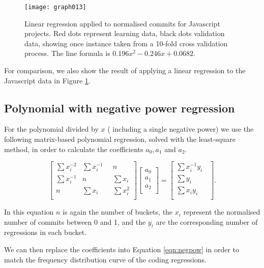 \documentclass[10pt,journal,compsoc]{IEEEtran}
\begin{document}
\begin{figure}[t]
\centering
\texttt{[image: graph013]}%
\caption{\label{fig:javascript-linear}Linear regression applied to normalised commits for Javascript projects. Red dots represent learning data, black dots validation data, showing once instance taken from a 10-fold cross validation process. The line formula is $0.196x^{2} - 0.246x + 0.0682$.}
\end{figure}


For comparison, we also show the result of applying a linear regression to the Javascript data in Figure \ref{fig:javascript-linear}.

\subsection{Polynomial with negative power regression}

For the polynomial divided by $x$ (\ie\/ including a single negative power) we use the following matrix-based polynomial regression, solved with the least-square method, in order to calculate the coefficients $a_0, a_1$ and $a_2$.

\begin{equation}
\begin{bmatrix}
\sum x_i^{-2} & \sum x_i^{-1}        & n            \\
\sum x_i^{-1} & n                    & \sum x_i     \\
n             & \sum x_i \phantom{-} & \sum x_i^{2} \\
\end{bmatrix}
\begin{bmatrix}
a_0 \\
a_1 \\
a_2 \\
\end{bmatrix}
=
\begin{bmatrix}
\sum x_i^{-1} y_i        \\
\sum y_i \phantom{x_i -} \\
\sum x_i y_i \phantom{-} \\
\end{bmatrix}.
\end{equation}

In this equation $n$ is again the number of buckets, the $x_i$ represent the normalised number of commits between 0 and 1, and the $y_i$ are the corresponding number of regressions in each bucket.

We can then replace the coefficients into Equation \ref{eqn:negpow} in order to match the frequency distribution curve of the coding regressions.
\end{document}
